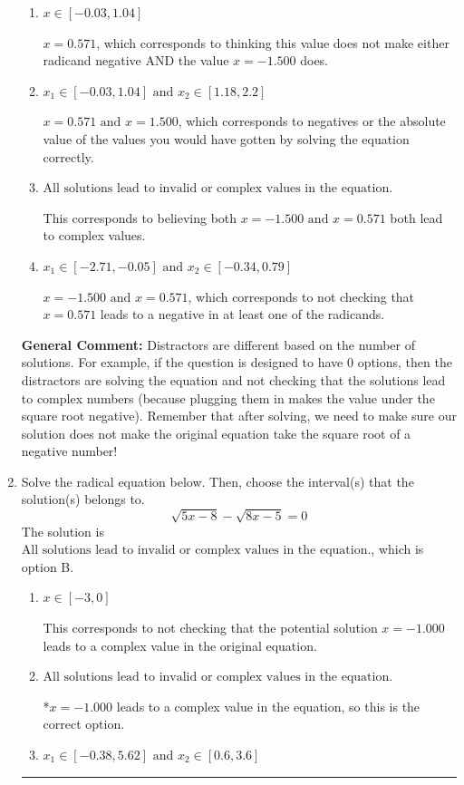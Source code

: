 \documentclass{extbook}[14pt]
\newcommand{\litem}[1]{\item #1

\rule{\textwidth}{0.4pt}}
\begin{document}
\begin{enumerate}
{\begin{enumerate}[label=\Alph*.]
* This is the correct option.
\item \( x \in [-0.03,1.04] \)

$x = 0.571$, which corresponds to thinking this value does not make either radicand negative AND the value $x = -1.500$ does.
\item \( x_1 \in [-0.03, 1.04] \text{ and } x_2 \in [1.18,2.2] \)

$x = 0.571 \text{ and } x = 1.500$, which corresponds to negatives or the absolute value of the values you would have gotten by solving the equation correctly.
\item \( \text{All solutions lead to invalid or complex values in the equation.} \)

This corresponds to believing both $x = -1.500 \text{ and } x = 0.571$ both lead to complex values.
\item \( x_1 \in [-2.71, -0.05] \text{ and } x_2 \in [-0.34,0.79] \)

$x = -1.500 \text{ and } x = 0.571$, which corresponds to not checking that $x = 0.571$ leads to a negative in at least one of the radicands.
\end{enumerate}

\textbf{General Comment:} Distractors are different based on the number of solutions. For example, if the question is designed to have 0 options, then the distractors are solving the equation and not checking that the solutions lead to complex numbers (because plugging them in makes the value under the square root negative). Remember that after solving, we need to make sure our solution does not make the original equation take the square root of a negative number!
}
\litem{
Solve the radical equation below. Then, choose the interval(s) that the solution(s) belongs to.
\[ \sqrt{5 x - 8} - \sqrt{8 x - 5} = 0 \]The solution is \( \text{All solutions lead to invalid or complex values in the equation.} \), which is option B.\begin{enumerate}[label=\Alph*.]
\item \( x \in [-3,0] \)

This corresponds to not checking that the potential solution $x = -1.000$ leads to a complex value in the original equation.
\item \( \text{All solutions lead to invalid or complex values in the equation.} \)

*$x = -1.000$ leads to a complex value in the equation, so this is the correct option.
\item \( x_1 \in [-0.38, 5.62] \text{ and } x_2 \in [0.6,3.6] \)


\end{enumerate}}
\end{enumerate}
\end{document}
